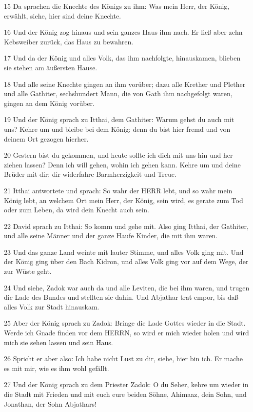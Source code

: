 \par 15 Da sprachen die Knechte des Königs zu ihm: Was mein Herr, der König, erwählt, siehe, hier sind deine Knechte.
\par 16 Und der König zog hinaus und sein ganzes Haus ihm nach. Er ließ aber zehn Kebsweiber zurück, das Haus zu bewahren.
\par 17 Und da der König und alles Volk, das ihm nachfolgte, hinauskamen, blieben sie stehen am äußersten Hause.
\par 18 Und alle seine Knechte gingen an ihm vorüber; dazu alle Krether und Plether und alle Gathiter, sechshundert Mann, die von Gath ihm nachgefolgt waren, gingen an dem König vorüber.
\par 19 Und der König sprach zu Itthai, dem Gathiter: Warum gehst du auch mit uns? Kehre um und bleibe bei dem König; denn du bist hier fremd und von deinem Ort gezogen hierher.
\par 20 Gestern bist du gekommen, und heute sollte ich dich mit uns hin und her ziehen lassen? Denn ich will gehen, wohin ich gehen kann. Kehre um und deine Brüder mit dir; dir widerfahre Barmherzigkeit und Treue.
\par 21 Itthai antwortete und sprach: So wahr der HERR lebt, und so wahr mein König lebt, an welchem Ort mein Herr, der König, sein wird, es gerate zum Tod oder zum Leben, da wird dein Knecht auch sein.
\par 22 David sprach zu Itthai: So komm und gehe mit. Also ging Itthai, der Gathiter, und alle seine Männer und der ganze Haufe Kinder, die mit ihm waren.
\par 23 Und das ganze Land weinte mit lauter Stimme, und alles Volk ging mit. Und der König ging über den Bach Kidron, und alles Volk ging vor auf dem Wege, der zur Wüste geht.
\par 24 Und siehe, Zadok war auch da und alle Leviten, die bei ihm waren, und trugen die Lade des Bundes und stellten sie dahin. Und Abjathar trat empor, bis daß alles Volk zur Stadt hinauskam.
\par 25 Aber der König sprach zu Zadok: Bringe die Lade Gottes wieder in die Stadt. Werde ich Gnade finden vor dem HERRN, so wird er mich wieder holen und wird mich sie sehen lassen und sein Haus.
\par 26 Spricht er aber also: Ich habe nicht Lust zu dir, siehe, hier bin ich. Er mache es mit mir, wie es ihm wohl gefällt.
\par 27 Und der König sprach zu dem Priester Zadok: O du Seher, kehre um wieder in die Stadt mit Frieden und mit euch eure beiden Söhne, Ahimaaz, dein Sohn, und Jonathan, der Sohn Abjathars!
